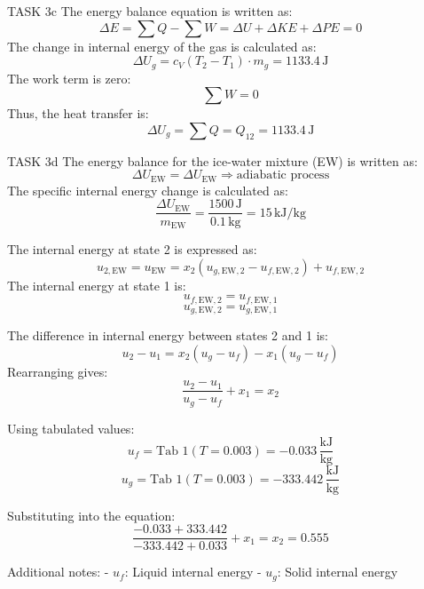 TASK 3c  
The energy balance equation is written as:  
\[
\Delta E = \sum Q - \sum W = \Delta U + \Delta KE + \Delta PE = 0
\]  
The change in internal energy of the gas is calculated as:  
\[
\Delta U_g = c_V (T_2 - T_1) \cdot m_g = 1133.4 \, \text{J}
\]  
The work term is zero:  
\[
\sum W = 0
\]  
Thus, the heat transfer is:  
\[
\Delta U_g = \sum Q = Q_{12} = 1133.4 \, \text{J}
\]  

TASK 3d  
The energy balance for the ice-water mixture (EW) is written as:  
\[
\Delta U_{\text{EW}} = \Delta U_{\text{EW}} \Rightarrow \text{adiabatic process}
\]  
The specific internal energy change is calculated as:  
\[
\frac{\Delta U_{\text{EW}}}{m_{\text{EW}}} = \frac{1500 \, \text{J}}{0.1 \, \text{kg}} = 15 \, \text{kJ/kg}
\]  

The internal energy at state 2 is expressed as:  
\[
u_{2,\text{EW}} = u_{\text{EW}} = x_2 (u_{g,\text{EW},2} - u_{f,\text{EW},2}) + u_{f,\text{EW},2}
\]  
The internal energy at state 1 is:  
\[
u_{f,\text{EW},2} = u_{f,\text{EW},1}
\]  
\[
u_{g,\text{EW},2} = u_{g,\text{EW},1}
\]  

The difference in internal energy between states 2 and 1 is:  
\[
u_2 - u_1 = x_2 (u_g - u_f) - x_1 (u_g - u_f)
\]  
Rearranging gives:  
\[
\frac{u_2 - u_1}{u_g - u_f} + x_1 = x_2
\]  

Using tabulated values:  
\[
u_f = \text{Tab 1} (T = 0.003) = -0.033 \, \frac{\text{kJ}}{\text{kg}}
\]  
\[
u_g = \text{Tab 1} (T = 0.003) = -333.442 \, \frac{\text{kJ}}{\text{kg}}
\]  

Substituting into the equation:  
\[
\frac{-0.033 + 333.442}{-333.442 + 0.033} + x_1 = x_2 = 0.555
\]  

Additional notes:  
- \( u_f \): Liquid internal energy  
- \( u_g \): Solid internal energy